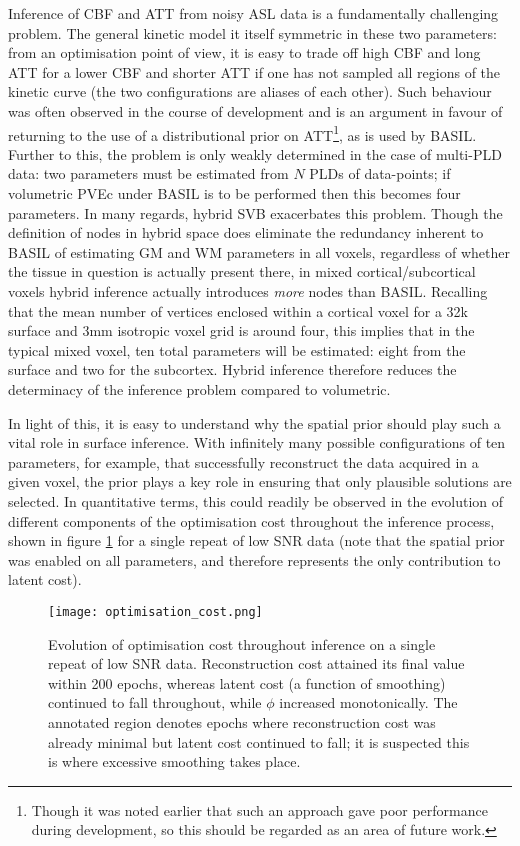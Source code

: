 Inference of CBF and ATT from noisy ASL data is a fundamentally challenging problem. The general kinetic model it itself symmetric in these two parameters: from an optimisation point of view, it is easy to trade off high CBF and long ATT for a lower CBF and shorter ATT if one has not sampled all regions of the kinetic curve (the two configurations are aliases of each other). Such behaviour was often observed in the course of development and is an argument in favour of returning to the use of a distributional prior on ATT\footnote{Though it was noted earlier that such an approach gave poor performance during development, so this should be regarded as an area of future work.}, as is used by BASIL. Further to this, the problem is only weakly determined in the case of multi-PLD data: two parameters must be estimated from $N$ PLDs of data-points; if volumetric PVEc under BASIL is to be performed then this becomes four parameters. In many regards, hybrid SVB exacerbates this problem. Though the definition of nodes in hybrid space does eliminate the redundancy inherent to BASIL of estimating GM and WM parameters in all voxels, regardless of whether the tissue in question is actually present there, in mixed cortical/subcortical voxels hybrid inference actually introduces \textit{more} nodes than BASIL. Recalling that the mean number of vertices enclosed within a cortical voxel for a 32k surface and 3mm isotropic voxel grid is around four, this implies that in the typical mixed voxel, ten total parameters will be estimated: eight from the surface and two for the subcortex. Hybrid inference therefore reduces the determinacy of the inference problem compared to volumetric. 

In light of this, it is easy to understand why the spatial prior should play such a vital role in surface inference. With infinitely many possible configurations of ten parameters, for example, that successfully reconstruct the data acquired in a given voxel, the prior plays a key role in ensuring that only plausible solutions are selected. In quantitative terms, this could readily be observed in the evolution of different components of the optimisation cost throughout the inference process, shown in figure \ref{optimisation_cost} for a single repeat of low SNR data (note that the spatial prior was enabled on all parameters, and therefore represents the only contribution to latent cost). 

\begin{figure}[H]
\centering
\texttt{[image: optimisation\_cost.png]}
\caption{Evolution of optimisation cost throughout inference on a single repeat of low SNR data. Reconstruction cost attained its final value within 200 epochs, whereas latent cost (a function of smoothing) continued to fall throughout, while $\phi$ increased monotonically. The annotated region denotes epochs where reconstruction cost was already minimal but latent cost continued to fall; it is suspected this is where excessive smoothing takes place.}
\label{optimisation_cost} 
\end{figure}

